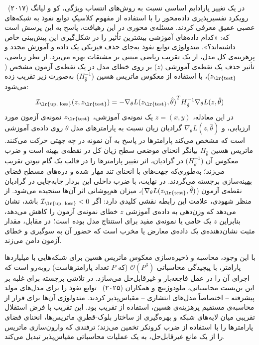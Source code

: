 در یک تغییر پارادایم اساسی نسبت به روش‌های انتساب ویژگی، کو و لیانگ (۲۰۱۷)~\cite{koh2017understanding} رویکرد تفسیرپذیری داده‌محور را با استفاده از مفهوم کلاسیکِ توابع نفوذ به شبکه‌های عصبی عمیق معرفی کردند. مسئله‌ی محوری در این رهیافت، پاسخ به این پرسش است که: «کدام داده‌های آموزشی بیشترین تأثیر را در شکل‌گیری این پیش‌بینی خاص داشته‌اند؟». متدولوژی توابع نفوذ به‌جای حذف فیزیکی یک داده و آموزش مجدد و پرهزینه‌ی کل مدل، از یک تقریب ریاضی مبتنی بر مشتقات بهره می‌برد. از نظر ریاضی، تأثیر حذف یک نقطه‌ی آموزشی ($z$) بر روی خطای مدل در یک نقطه‌ی آزمون مشخص ($z_{\text{\lr{test}}}$)، با استفاده از معکوس ماتریس هسین ($H_{\hat{\theta}}^{-1}$) به‌صورت زیر تقریب زده می‌شود:
\begin{equation}\label{eq:chap3_influence_function}
    \mathcal{I}_{\text{\lr{up, loss}}}(z, z_{\text{\lr{test}}}) = -\nabla_{\theta} {L(z_{\text{\lr{test}}}, \hat{\theta})}^T H_{\hat{\theta}}^{-1} \nabla_{\theta} L(z, \hat{\theta})
\end{equation}
در این معادله، $z = (x, y)$ یک نمونه‌ی آموزشی، $z_{\text{\lr{test}}}$ نمونه‌ی آزمون مورد ارزیابی، و $\nabla_{\theta} L(z, \hat{\theta})$ گرادیان زیان نسبت به پارامترهای مدل $\theta$ روی داده‌ی آموزشی است که مشخص می‌کند پارامترها در پاسخ به آن نمونه در چه جهتی حرکت می‌کنند. ماتریس هسین $H_{\hat{\theta}}$ بیانگر انحنای موضعی سطح زیان کل در نقطه‌ی بهینه است و ضرب معکوس آن ($H_{\hat{\theta}}^{-1}$) در گرادیان، اثر تغییر پارامترها را در قالب یک گام نیوتن تقریب می‌زند؛ به‌طوری‌که جهت‌های با انحنای تند مهار شده و دره‌های مسطح فضای بهینه‌سازی برجسته می‌گردند. در نهایت، با ضرب داخلی این بردار جابه‌جایی در گرادیان نقطه‌ی آزمون ($\nabla_{\theta} L(z_{\text{\lr{test}}}, \hat{\theta})$)، میزان هم‌پوشانی اثر آن‌ها سنجیده می‌شود. از منظر شهودی، علامت این رابطه نقشی کلیدی دارد: اگر $\mathcal{I}_{\text{\lr{up, loss}}} < 0$ باشد، نشان می‌دهد که وزن‌دهی به داده‌ی آموزشی $z$ خطای نمونه‌ی آزمون را کاهش می‌دهد، بنابراین $z$ یک حامی یا نمونه‌ی مفید برای استنتاج مدل بوده است؛ در مقابل، مقدار مثبت نشان‌دهنده‌ی یک داده‌ی معارض یا مخرب است که حضور آن به سوگیری و خطای آزمون دامن می‌زند. 

با این وجود، محاسبه و ذخیره‌سازی معکوس ماتریس هسین برای شبکه‌هایی با میلیاردها پارامتر، با پیچیدگی محاسباتی $\mathcal{O}(P^3)$ (که $P$ تعداد پارامترهاست) روبه‌رو است که اجرای آن را در عمل فاجعه‌بار و غیرقابل‌حل می‌سازد. در تلاشی برجسته برای غلبه بر این بن‌بست محاسباتی، ملودوژنیچ و همکاران (۲۰۲۵)~\cite{mlodozeniec2025influence} توابع نفوذ را برای مدل‌های مولد پیشرفته – اختصاصاً مدل‌های انتشاری – مقیاس‌پذیر کردند. متدولوژی آن‌ها برای فرار از محاسبه‌ی مستقیم پرهزینه‌ی هسین، استفاده از تقریب  بود. این تقریب با فرض استقلال تقریبی میان لایه‌های شبکه و بهره‌گیری از ساختار بلوک-قطریِ ماتریس‌ها، انحنای فضای پارامترها را با استفاده از ضرب کرونکر تخمین می‌زند؛ ترفندی که وارون‌سازی ماتریس را از یک مانع غیرقابل‌حل، به یک عملیات محاسباتی مقیاس‌پذیر تبدیل می‌کند.


